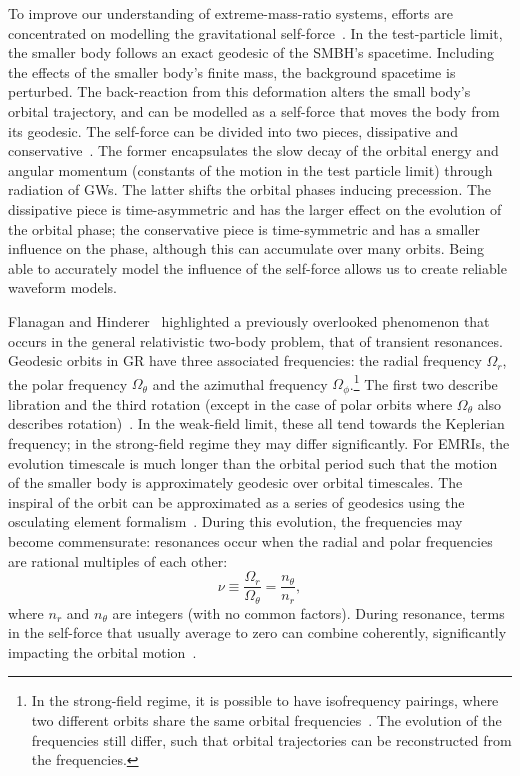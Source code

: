 \documentclass[aps,prd,amsfonts,amssymb,amsmath,nofootinbib,showpacs,superscriptaddress,twocolumn,floatfix]{revtex4-1}
\begin{document}
To improve our understanding of extreme-mass-ratio systems, efforts are concentrated on modelling the gravitational self-force~\cite{Barack2009,Poisson2004,Pound2015}. In the test-particle limit, the smaller body follows an exact geodesic of the SMBH's spacetime. Including the effects of the smaller body's finite mass, the background spacetime is perturbed. The back-reaction from this deformation alters the small body's orbital trajectory, and can be modelled as a self-force that moves the body from its geodesic. The self-force can be divided into two pieces, dissipative and conservative~\cite{Sago2008,Barack2009}. The former encapsulates the slow decay of the orbital energy and angular momentum (constants of the motion in the test particle limit) through radiation of GWs. The latter shifts the orbital phases inducing precession. The dissipative piece is time-asymmetric and has the larger effect on the evolution of the orbital phase; the conservative piece is time-symmetric and has a smaller influence on the phase, although this can accumulate over many orbits. Being able to accurately model the influence of the self-force allows us to create reliable waveform models.

Flanagan and Hinderer~\cite{Flanagan2012} highlighted a previously overlooked phenomenon that occurs in the general relativistic two-body problem, that of transient resonances. Geodesic orbits in GR have three associated frequencies: the radial frequency $\Omega_r$, the polar frequency $\Omega_\theta$ and the azimuthal frequency $\Omega_\phi$.\footnote{In the strong-field regime, it is possible to have isofrequency pairings, where two different orbits share the same orbital frequencies~\cite{Warburton2013}. The evolution of the frequencies still differ, such that orbital trajectories can be reconstructed from the frequencies.} The first two describe libration and the third rotation (except in the case of polar orbits where $\Omega_\theta$ also describes rotation)~\cite{Goldstein2002}. %
In the weak-field limit, these all tend towards the Keplerian frequency; in the strong-field regime they may differ significantly. For EMRIs, the evolution timescale is much longer than the orbital period such that the motion of the smaller body is approximately geodesic over orbital timescales. The inspiral of the orbit can be approximated as a series of geodesics using the osculating element formalism~\cite{Pound2008,Gair2011a}. During this evolution, the frequencies may become commensurate: resonances occur when the radial and polar frequencies are rational multiples of each other:
\begin{equation}
\nu \equiv \frac{\Omega_r}{\Omega_\theta} = \frac{n_\theta}{n_r},
\end{equation}
where $n_r$ and $n_\theta$ are integers (with no common factors). During resonance, terms in the self-force that usually average to zero can combine coherently, significantly impacting the orbital motion~\cite{Flanagan2012a}.
\end{document}
